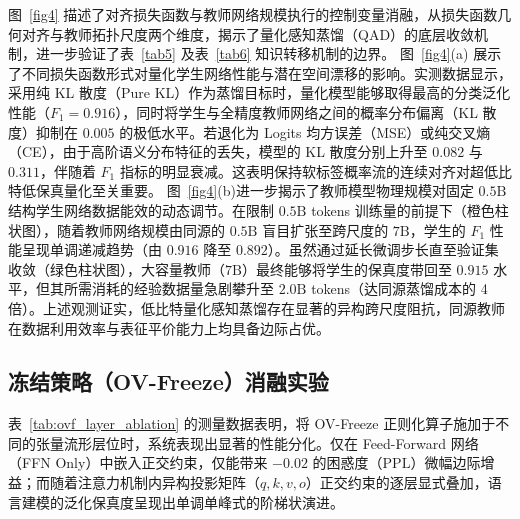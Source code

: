 \documentclass[11pt, a4paper]{article}
\begin{document}
图~\ref{fig4} 描述了对齐损失函数与教师网络规模执行的控制变量消融，从损失函数几何对齐与教师拓扑尺度两个维度，揭示了量化感知蒸馏（QAD）的底层收敛机制，进一步验证了表~\ref{tab5} 及表~\ref{tab6} 知识转移机制的边界。
图~\ref{fig4}(a) 展示了不同损失函数形式对量化学生网络性能与潜在空间漂移的影响。实测数据显示，采用纯 KL 散度（Pure KL）作为蒸馏目标时，量化模型能够取得最高的分类泛化性能（$F_1 = 0.916$），同时将学生与全精度教师网络之间的概率分布偏离（KL 散度）抑制在 $0.005$ 的极低水平。若退化为 Logits 均方误差（MSE）或纯交叉熵（CE），由于高阶语义分布特征的丢失，模型的 KL 散度分别上升至 $0.082$ 与 $0.311$，伴随着 $F_1$ 指标的明显衰减。这表明保持软标签概率流的连续对齐对超低比特低保真量化至关重要。
图~\ref{fig4}(b)进一步揭示了教师模型物理规模对固定 $0.5\mathrm{B}$ 结构学生网络数据能效的动态调节。在限制 $0.5\mathrm{B}$ tokens 训练量的前提下（橙色柱状图），随着教师网络规模由同源的 $0.5\mathrm{B}$ 盲目扩张至跨尺度的 $7\mathrm{B}$，学生的 $F_1$ 性能呈现单调递减趋势（由 $0.916$ 降至 $0.892$）。虽然通过延长微调步长直至验证集收敛（绿色柱状图），大容量教师（$7\mathrm{B}$）最终能够将学生的保真度带回至 $0.915$ 水平，但其所需消耗的经验数据量急剧攀升至 $2.0\mathrm{B}$ tokens（达同源蒸馏成本的 4 倍）。上述观测证实，低比特量化感知蒸馏存在显著的异构跨尺度阻抗，同源教师在数据利用效率与表征平价能力上均具备边际占优。

\subsection{冻结策略（OV-Freeze）消融实验}

表~\ref{tab:ovf_layer_ablation} 的测量数据表明，将 OV-Freeze 正则化算子施加于不同的张量流形层位时，系统表现出显著的性能分化。仅在 Feed-Forward 网络（FFN Only）中嵌入正交约束，仅能带来 $-0.02$ 的困惑度（$\mathrm{PPL}$）微幅边际增益；而随着注意力机制内异构投影矩阵（$q, k, v, o$）正交约束的逐层显式叠加，语言建模的泛化保真度呈现出单调单峰式的阶梯状演进。
\end{document}
